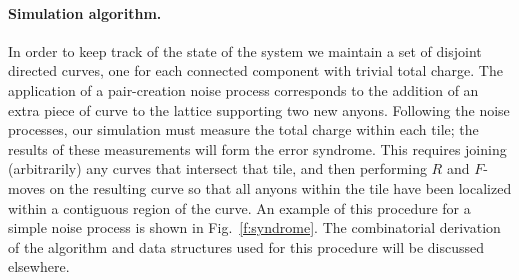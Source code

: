 \documentclass[aps, prl, letterpaper, twocolumn, superscriptaddress, notitlepage, 10pt]{revtex4}
\newcommand{\Fref}[1]{Fig.~\ref{#1}}
\newcommand{\cggb}[1]{\textcolor{blue}{#1}}
\newcommand{\dude}[1]{\textcolor{red}{#1}}
\begin{document}
\paragraph{Simulation algorithm.}



In order to keep track of the state of the system we maintain 
a set of disjoint directed curves, 
one for each connected component with trivial total charge.
The application of a pair-creation noise process corresponds to the 
addition of an extra piece of curve to the lattice supporting
two new anyons.
Following the noise processes, our simulation must %
measure the total charge within each tile; the results of 
these measurements will form the error syndrome. 
This requires joining (arbitrarily) any curves that intersect that tile, 
and then performing $R$ and $F$-moves on the resulting
curve so that 
all anyons within the tile have been 
localized within a contiguous region of the curve. 
An example of this 
procedure for a simple noise process is shown in \Fref{f:syndrome}.
The combinatorial derivation of the algorithm and data structures used for 
this procedure will be discussed elsewhere.
\end{document}
